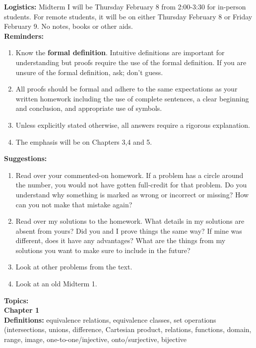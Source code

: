 \documentclass[12pt]{article}
\begin{document}
\textbf{Logistics:} Midterm I will be Thursday February 8 from 2:00-3:30 for in-person students. For remote students, it will be on either Thursday February 8 or Friday February 9. No notes, books or other aids.\\

\textbf{Reminders:}
\begin{enumerate}
	\item Know the \textbf{formal definition}. Intuitive definitions are important for understanding but proofs require the use of the formal definition. If you are unsure of the formal definition, ask; don't guess.
	\item All proofs should be formal and adhere to the same expectations as your written homework including the use of complete sentences, a clear beginning and conclusion, and appropriate use of symbols.
	\item Unless explicitly stated otherwise, all answers require a rigorous explanation.
	\item The emphasis will be on Chapters 3,4 and 5.
\end{enumerate}

\textbf{Suggestions:}
\begin{enumerate}
	\item Read over your commented-on homework. If a problem has a circle around the number, you would not have gotten full-credit for that problem. Do you understand why something is marked as wrong or incorrect or missing? How can you not make that mistake again?
	\item Read over my solutions to the homework. What details in my solutions are absent from yours? Did you and I prove things the same way? If mine was different, does it have any advantages? What are the things from my solutions you want to make sure to include in the future?
	\item Look at other problems from the text.
	\item Look at an old Midterm 1.
\end{enumerate}

\textbf{Topics:}\\

\noindent \textbf{Chapter 1}\\

\textbf{Definitions:} equivalence relations, equivalence classes, set operations (intersections, unions, difference, Cartesian product, relations, functions, domain, range, image, one-to-one/injective, onto/surjective, bijective
\end{document}
